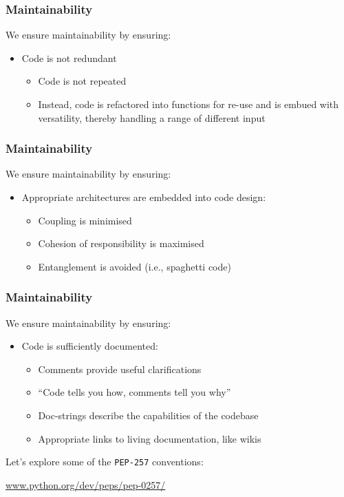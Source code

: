 \begin{frame}[fragile]
	\frametitle{Maintainability}
		
	We ensure maintainability by ensuring:
	
	\begin{itemize}
		\item Code is not redundant
		\begin{itemize}
			\item Code is not repeated
			\item Instead, code is refactored into functions for re-use and is embued with versatility, thereby handling a range of different input
		\end{itemize}				
	\end{itemize}
	
\end{frame}

\begin{frame}[fragile]
	\frametitle{Maintainability}
		
	We ensure maintainability by ensuring:
	
	\begin{itemize}
		\item Appropriate architectures are embedded into code design:
		\begin{itemize}
			\item Coupling is minimised
			\item Cohesion of responsibility is maximised
			\item Entanglement is avoided (i.e., spaghetti code)
		\end{itemize}		
	\end{itemize}
	
\end{frame}

\begin{frame}[fragile]
	\frametitle{Maintainability}
		
	We ensure maintainability by ensuring:
	
	\begin{itemize}
		\item Code is sufficiently documented:
		\begin{itemize}
			\item Comments provide useful clarifications
			\item ``Code tells you how, comments tell you why''
			\item Doc-strings describe the capabilities of the codebase
			\item Appropriate links to living documentation, like wikis
		\end{itemize}		
	\end{itemize}
	
	Let's explore some of the \texttt{PEP-257} conventions:
	
	\vspace{1em}
	
	 \url{www.python.org/dev/peps/pep-0257/}	
	
\end{frame}

